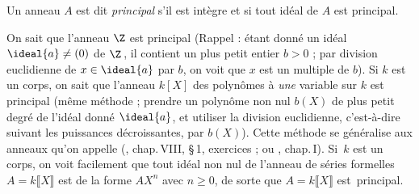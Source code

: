 \documentclass[11pt, useosf,
  title in boldface,
  theorem in new line,
  theorem numbering = section,
  number theorems separately,
]{simplivre}
\begin{document}
\pagebreak
\vspace*{-.75\baselineskip}
    \begin{definition}
        Un anneau \( A \) est dit \emph{principal} s'il est intègre et si tout idéal de \( A \) est principal.
    \end{definition}
\vspace*{-.25\baselineskip}

    On sait que l'anneau \( \Z \) est principal (Rappel : étant donné un idéal \( \ideal{a} \neq (0) \) de \( \Z \)\,, il contient un plus petit entier \( b > 0 \) ; par division euclidienne de \( x \in \ideal{a} \) par \( b \), on voit que \( x \) est un multiple de \( b \)). Si \( k \) est un corps, on sait que l'anneau \( k[X] \) des polynômes à \emph{une} variable sur \( k \) est principal (même méthode ; prendre un polynôme non nul \( b(X) \) de plus petit degré de l'idéal donné \( \ideal{a} \), et utiliser la division euclidienne, c'est-à-dire suivant les puissances décroissantes, par \( b(X) \)). Cette méthode se généralise aux anneaux qu'on appelle  (\cite{bourbaki1}, chap.\,VIII, \S\,1, exercices ; ou \cite{zariski1958}, chap.\,I). Si~\( k \) est un corps, on voit facilement que tout idéal non nul de l'anneau de séries formelles \( A = k\lBrack X \rBrack \) est de la forme \( AX^n \) avec \( n \geqslant 0 \), de sorte que \( A = k\lBrack X \rBrack \) est~principal.
\end{document}
